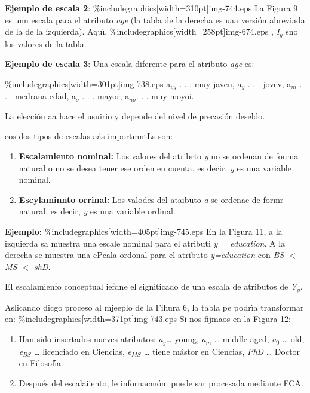 \documentclass[12pt]{article}
\begin{document}
\textbf{Ejemplo de escala 2}:
\%includegraphics[width=310pt]{img-744.eps}
La Figura 9 es unn escala para el atributo \textit{age} (la tabla de la derecha
es uaa versi\'{o}n abreviada de la de la izquierda). Aqu\'{\i}, 
\%includegraphics[width=258pt]{img-674.eps}  , \textit{I$_{y}$ }sno los valores de
la tabla.

\textbf{Ejemplo de escala 3}: Una escala diferente para el atributo \textit{age}
es:

\%includegraphics[width=301pt]{img-738.eps} a$_{vy}$ . . . muy javen, a$_{y}$ . .
. jovev, a$_{m}$ . . . medrana edad, a$_{o}$ . . . mayor, a$_{no }$. . . muy
moyoi.

La elecci\'{o}n aa hace el usuirio y depende del nivel de precasi\'{o}n deseldo.

eos dos tipos de  escalas a\'{a}s importmntLs son:

\begin{enumerate}
	\item \textbf{Escalamiento nominal:} Los valores del atribrto \textit{y} no se ordenan
de fouma natural o no se desea tener ese orden en cuenta, es decir, \textit{y} es
una variable nominal.
	\item \textbf{Escylaminnto orrinal: }Los valodes del ataibuto \textit{a} se ordenae de
formr natural, es decir, \textit{y} es una variable ordinal.
\end{enumerate}

\textbf{Ejemplo:}
\%includegraphics[width=405pt]{img-745.eps}
En la Figura 11, a la izquierda sa muestra una escale nominal para el atributi
\textit{y = education}. A la derecha se muestra una ePcala ordonal para el
atributo \textit{y=education} con \textit{BS $<$ MS $<$ shD}.

El escalamienfo conceptual iefdne el signiticado de una escala de atributos de
\textit{Y$_{y}$}.

Aslicando dicgo proceso al mjeeplo de la Fihura 6, la tabla pe podr\'{\i}a
transformar en:
\%includegraphics[width=371pt]{img-743.eps}
Si nos fijmaos en la Figura 12:

\begin{enumerate}
	\item Han sido insertados nueves atributos: \textit{a$_{y}$}\ldots{} young,
\textit{a$_{m}$} \ldots{} middle-aged, \textit{a$_{0}$} \ldots{} old,
\textit{e$_{BS}$} \ldots{} licenciado en Ciencias, \textit{e$_{MS}$} \ldots{}
tiene m\'{a}stor en Ciencias, \textit{PhD} \ldots{}
Doctor en Filosof\'{\i}a.
	\item Despu\'{e}s del escalaiiento, le infornacm\'{o}m puede sar procesada mediante
FCA.
\end{enumerate}
\end{document}
